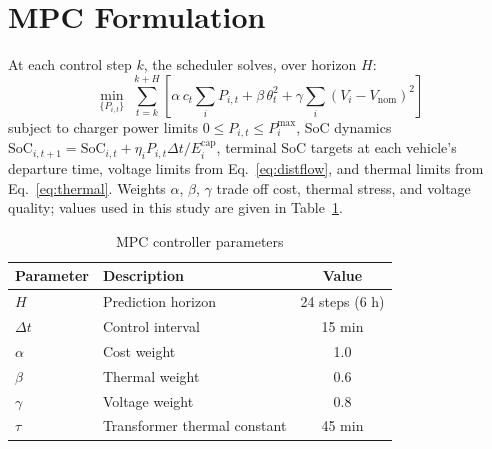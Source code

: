 \section{MPC Formulation}
At each control step $k$, the scheduler solves, over horizon $H$:
\begin{equation}
\min_{\{P_{i,t}\}} \; \sum_{t=k}^{k+H} \left[ \alpha \, c_t \sum_i P_{i,t} + \beta \, \theta_t^2 +
\gamma \sum_i (V_i - V_{\text{nom}})^2 \right]
\label{eq:objective}
\end{equation}
subject to charger power limits $0 \le P_{i,t} \le P_i^{\max}$, SoC dynamics
$\mathrm{SoC}_{i,t+1} = \mathrm{SoC}_{i,t} + \eta_i P_{i,t} \Delta t / E_i^{\text{cap}}$, terminal
SoC targets at each vehicle's departure time, voltage limits from Eq.~\eqref{eq:distflow}, and
thermal limits from Eq.~\eqref{eq:thermal}. Weights $\alpha$, $\beta$, $\gamma$ trade off cost,
thermal stress, and voltage quality; values used in this study are given in
Table~\ref{tab:params}.

\begin{table}[htbp]
\centering
\caption{MPC controller parameters}
\label{tab:params}
\begin{tabular}{@{}llc@{}}
\toprule
\textbf{Parameter} & \textbf{Description} & \textbf{Value} \\
\midrule
$H$ & Prediction horizon & 24 steps (6 h) \\
$\Delta t$ & Control interval & 15 min \\
$\alpha$ & Cost weight & 1.0 \\
$\beta$ & Thermal weight & 0.6 \\
$\gamma$ & Voltage weight & 0.8 \\
$\tau$ & Transformer thermal constant & 45 min \\
\bottomrule
\end{tabular}
\end{table}
